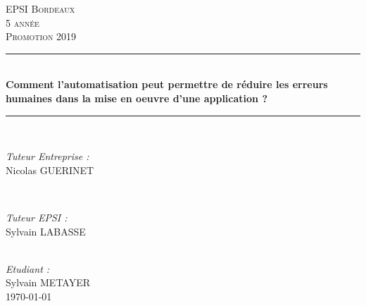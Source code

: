 \begin{titlepage}

\newcommand{\HRule}{\rule{\linewidth}{0.5mm}} %

\center %
 

\textsc{\LARGE EPSI Bordeaux}\\[1.5cm] %
\textsc{\Large 5 année}\\[0.5cm] %
\textsc{\large Promotion 2019}\\[0.5cm] %
\space

\HRule \\[0.4cm]
{ \huge \bfseries Comment l'automatisation peut permettre de réduire les erreurs humaines dans la mise en oeuvre d'une application ?}\\[0.4cm] %
\HRule \\[1.5cm]

\begin{minipage}{0.4\textwidth}
\begin{flushleft} \large
\emph{Tuteur Entreprise :}\\
Nicolas \textsc{GUERINET} %
\end{flushleft}
\end{minipage}
~
\begin{minipage}{0.4\textwidth}
\begin{flushright} \large
\emph{Tuteur EPSI :} \\
Sylvain \textsc{LABASSE} %
\end{flushright}
\end{minipage}\\[2cm]

\Large \emph{Etudiant :}\\
Sylvain \textsc{METAYER}\\[3cm] %

{\large \today}\\[2cm] %


\end{titlepage}
